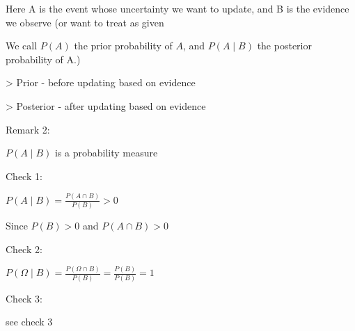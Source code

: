 \documentclass[12 pt]{article}
\begin{document}
Here A is the event whose uncertainty we want to update, and B is the evidence we observe (or want to treat as given

We call \(P(A)\) the prior probability of \(A\), and \(P(A \mid B)\) the posterior probability of A.)

> Prior - before updating based on evidence

> Posterior - after updating based on evidence

Remark 2:

\(P(A \mid B)\) is a probability measure

Check 1:

\(P(A \mid B) = \frac{P(A \cap B)}{P(B)} > 0\)

Since \(P(B) > 0\) and \(P(A \cap B) > 0\)

Check 2:

\(P(\Omega \mid B) = \frac{P(\Omega \cap B)}{P(B)} = \frac{P(B)}{P(B)} = 1\)

Check 3:

see check 3
\end{document}
